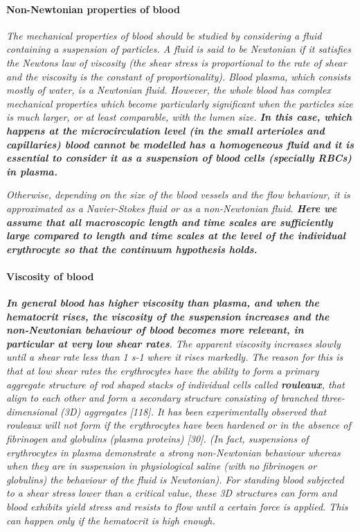 \documentclass[11pt,letterpaper]{article}
\begin{document}
\paragraph{Non-Newtonian properties of blood} \textit{The mechanical properties of blood should be studied by considering a fluid containing a suspension of particles. A fluid is said to be Newtonian if it satisfies the Newtons law of viscosity (the shear stress is proportional to the rate of shear and the viscosity is the constant of proportionality). Blood plasma, which consists mostly of water, is a Newtonian fluid. However, the whole blood has complex mechanical properties which become particularly significant when the particles size is much larger, or at least comparable, with the lumen size. \textbf{In this case, which happens at the microcirculation level (in the small arterioles and capillaries) blood cannot be modelled has a homogeneous fluid and it is essential to consider it as a suspension of blood cells (specially RBCs) in plasma.}}

\textit{Otherwise, depending on the size of the blood vessels and the flow behaviour, it is approximated as a
Navier-Stokes fluid or as a non-Newtonian fluid.{\color{blue}\textbf{ Here we assume that all macroscopic length and time scales are sufficiently large compared to length and time scales at the level of the individual erythrocyte so that the continuum hypothesis holds.}} }

\paragraph{Viscosity of blood}
\textit{\textbf{In general blood has higher viscosity than plasma, and when the hematocrit rises, the viscosity of the suspension increases and the non-Newtonian behaviour of blood becomes more relevant, in particular at {\color{blue}very low shear rates}}. The apparent viscosity increases slowly until a shear rate less than 1 s-1
where it rises markedly. The reason for this is that at low shear rates the erythrocytes have the ability to form a primary aggregate structure of rod shaped stacks of individual cells called \textbf{rouleaux}, that align to each other and form a secondary structure consisting of branched three-dimensional (3D) aggregates [118]. It has been experimentally observed that rouleaux will not form if the erythrocytes have been hardened or in the absence of fibrinogen and globulins (plasma proteins) [30]. (In fact, suspensions of erythrocytes in plasma demonstrate a strong non-Newtonian behaviour whereas when they are in suspension in physiological saline (with no fibrinogen or globulins) the behaviour of the fluid is Newtonian). For standing blood subjected to a shear stress lower than a critical value, these 3D structures can form and blood exhibits yield stress and resists to flow until a certain force is applied. This can happen only if the hematocrit is high enough.}
\end{document}
